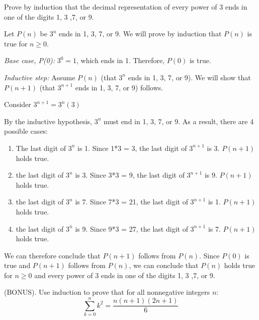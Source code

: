 \documentclass[solution, letterpaper]{cs20inclass}
\begin{document}
\problem

Prove by induction that the decimal representation of every power of $3$ ends in one of the digits 1, 3 ,7, or 9.

\begin{solution}

Let $P(n)$ be $3^n$ ends in 1, 3, 7, or 9. We will prove by induction that $P(n)$ is true for $n\geq0$.

\textit{Base case, P(0):} $3^0 = 1$, which ends in 1. Therefore, $P(0)$ is true.

\textit{Inductive step:} Assume $P(n)$ (that $3^n$ ends in 1, 3, 7, or 9). We will show that $P(n+1)$ (that $3^{n+1}$ ends in 1, 3, 7, or 9) follows.

Consider $3^{n+1} = 3^n (3)$

By the inductive hypothesis, $3^n$ must end in 1, 3, 7, or 9. As a result, there are 4 possible cases:

\begin{enumerate}

\item The last digit of $3^n$ is 1. Since 1*3 = 3, the last digit of $3^{n+1}$ is 3. $P(n+1)$ holds true.

\item the last digit of $3^n$ is 3. Since 3*3 = 9, the last digit of $3^{n+1}$ is 9. $P(n+1)$ holds true.

\item the last digit of $3^n$ is 7. Since 7*3 = 21, the last digit of $3^{n+1}$ is 1. $P(n+1)$ holds true.

\item the last digit of $3^n$ is 9. Since 9*3 = 27, the last digit of $3^{n+1}$ is 7. $P(n+1)$ holds true.

\end{enumerate}

We can therefore conclude that $P(n+1)$ follows from $P(n)$. Since $P(0)$ is true and $P(n+1)$ follows from $P(n)$, we can conclude that $P(n)$ holds true for $n \geq 0$ and every power of $3$ ends in one of the digits 1, 3 ,7, or 9.

\end{solution}

\problem 

(BONUS). Use induction to prove that for all nonnegative integers $n$:
\[ \sum_{k=0}^{n}k^{2}=\frac{n(n+1)(2n+1)}{6} \]
\end{document}
